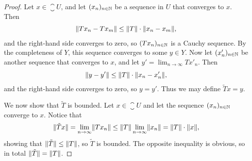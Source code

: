 \documentclass[article, a4paper, 11pt, oneside]{memoir}
\makeatletter
\let\phi\varphi
\numberwithin{equation}{chapter}
\newcommand{\calH}{\mathcal{H}}
\theoremstyle{myexample}
\theoremstyle{myexample}
\theoremstyle{myexamplebreak}
\theoremstyle{myexamplebreak}
\theoremstyle{nonumberplain}
\newtheorem{proof}{\protect\@proof}
\theoremstyle{MyNonumberplain}
\newcommand{\@proof}{}
\renewcommand{\@proof}{Proof}%
\renewcommand{\@proof}{Bevis}%
\makeatother
\begin{document}
\begin{proof}
    Let $x \in \closure{U}$, and let $(x_n)_{n \in \mathbb{N}}$ be a sequence in $U$ that converges to $x$. Then
    \begin{equation*}
        \lVert Tx_n - Tx_m\rVert \leq \lVert T\rVert \cdot \lVert x_n - x_m\rVert,
    \end{equation*}
    and the right-hand side converges to zero, so $(Tx_n)_{n \in \mathbb{N}}$ is a Cauchy sequence. By the completeness of $Y$, this sequence converges to some $y \in Y$. Now let $(x'_n)_{n \in \mathbb{N}}$ be another sequence that converges to $x$, and let $y' = \lim_{n \to \infty} Tx'_n$. Then
    \begin{equation*}
        \lVert y - y'\rVert
            \leq \lVert T\rVert \cdot \lVert x_n - x'_n\rVert,
    \end{equation*}
    and the right-hand side converges to zero, so $y = y'$. Thus we may define $\tilde{T}x = y$.
    
    We now show that $\tilde{T}$ is bounded. Let $x \in \closure{U}$ and let the sequence $(x_n)_{n \in \mathbb{N}}$ converge to $x$. Notice that
    \begin{equation*}
        \lVert\tilde{T}x\rVert
            = \lim_{n \to \infty} \lVert Tx_n\rVert
            \leq \lVert T\rVert \lim_{n \to \infty} \lVert x_n\rVert
            = \lVert T\rVert \cdot \lVert x\rVert,
    \end{equation*}
    showing that $\lVert\tilde{T}\rVert \leq \lVert T\rVert$, so $\tilde{T}$ is bounded. The opposite inequality is obvious, so in total $\lVert\tilde{T}\rVert = \lVert T\rVert$.
\end{proof}



    
\end{document}
